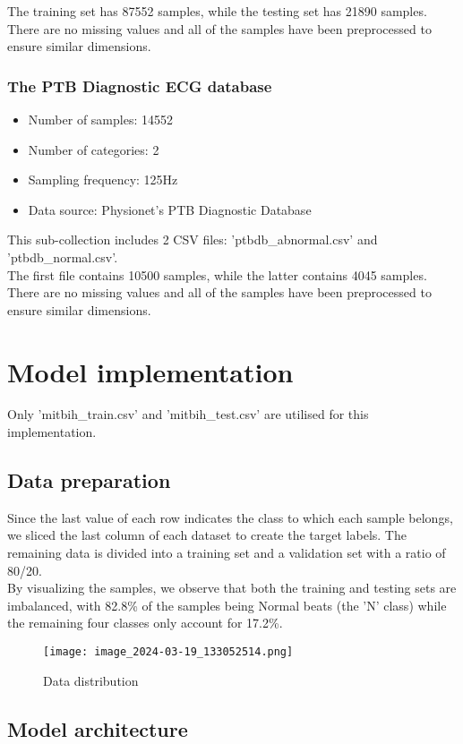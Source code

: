 \documentclass{report}
\begin{document}
The training set has 87552 samples, while the testing set has 21890 samples. There are no missing values and all of the samples have been preprocessed to ensure similar dimensions.
\subsection{The PTB Diagnostic ECG database}
\begin{itemize}
    \item Number of samples: 14552
    \item Number of categories: 2
    \item Sampling frequency: 125Hz
    \item Data source: Physionet's PTB Diagnostic Database
\end{itemize}

This sub-collection includes 2 CSV files: 'ptbdb\_abnormal.csv' and 'ptbdb\_normal.csv'.\\

The first file contains 10500 samples, while the latter contains 4045 samples. There are no missing values and all of the samples have been preprocessed to ensure similar dimensions.

\chapter{Model implementation}
Only 'mitbih\_train.csv' and 'mitbih\_test.csv' are utilised for this implementation.
\section{Data preparation}

Since the last value of each row indicates the class to which each sample belongs, we sliced the last column of each dataset to create the target labels. The remaining data is divided into a training set and a validation set with a ratio of 80/20.\\

By visualizing the samples, we observe that both the training and testing sets are imbalanced, with 82.8\% of the samples being Normal beats (the 'N' class) while the remaining four classes only account for 17.2\%.

\begin{figure}[!h]
    \centering
    \texttt{[image: image\_2024-03-19\_133052514.png]}\hfill
    \caption{Data distribution}
\end{figure}
\section{Model architecture}
\end{document}
